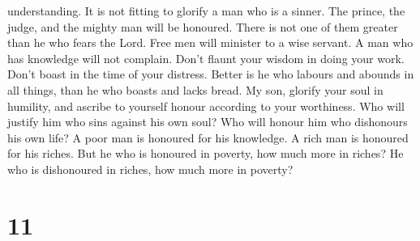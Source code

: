 understanding. It is not fitting to glorify a man who is a sinner.
 The prince, the judge, and the mighty man will be
honoured. There is not one of them greater than he who fears the Lord.
 Free men will minister to a wise servant. A man who has
knowledge will not complain.  Don't flaunt your wisdom in
doing your work. Don't boast in the time of your distress. 
Better is he who labours and abounds in all things, than he who boasts
and lacks bread.  My son, glorify your soul in humility,
and ascribe to yourself honour according to your worthiness.
 Who will justify him who sins against his own soul? Who
will honour him who dishonours his own life?  A poor man is
honoured for his knowledge. A rich man is honoured for his riches.
 But he who is honoured in poverty, how much more in
riches? He who is dishonoured in riches, how much more in poverty?

\hypertarget{section-8}{%
\section{11}\label{section-8}}

